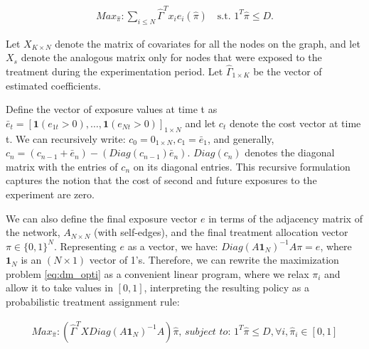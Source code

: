\documentclass[11pt,a4paper]{article}
\begin{document}
\begin{align}\label{eq:dm_opti}
Max_{\hat \pi} : \sum_{i \leq N} \hat \Gamma^T x_i e_i(\hat \pi)  \quad \mbox{s.t. } 1^T \hat \pi \leq D .
\end{align}

Let $X_{K \times N}$ denote the matrix of covariates for all the nodes on the graph, and let $X_s$ denote the analogous matrix only for nodes that were exposed to the treatment during the experimentation period. Let $\hat \Gamma _{1 \times K}$ be the vector of estimated coefficients.

Define the vector of exposure values at time t as $\bar e_t=[\mathbf{1}(e_{1t}>0), \dots, \mathbf{1}(e_{Nt}>0)]_{1 \times N}$ and let $c_t$ denote the cost vector at time t.  We can recursively write: $c_0 = 0_{1 \times N}, c_1 = \bar e_1$, and generally, $c_n = (c_{n-1} + \bar e_n) - (Diag(c_{n-1})  \bar e_n) $. $Diag(c_n)$ denotes the diagonal matrix with the entries of $c_n$ on its diagonal entries. This recursive formulation captures the notion that the cost of second and future exposures to the experiment are zero.

We can also define the final exposure vector $e$ in terms of the adjacency matrix of the network, $A_{N \times N}$ (with self-edges), and the final treatment allocation vector $\pi \in \{0,1\}^N$. Representing $e$ as a vector, we have: $Diag(A \mathbf{1}_{N} ) ^{-1} A\pi  = e$, where $\mathbf{1}_{N}$ is an $(N \times 1)$ vector of 1's. Therefore, we can rewrite the maximization problem \eqref{eq:dm_opti} as a convenient linear program, where we relax $\pi_i$ and allow it to take values in $[0,1]$, interpreting the resulting policy as a probabilistic treatment assignment rule:

\begin{align}\label{eq:dm_opti_lin}
Max_{\hat \pi}: \left(\hat \Gamma^T X Diag(A \mathbf{1}_{N} ) ^{-1} A \right) \hat \pi  \textit{, subject to: } 1^T \hat \pi \leq D , \forall i, \hat \pi_i \in [0,1]
\end{align}
\end{document}
